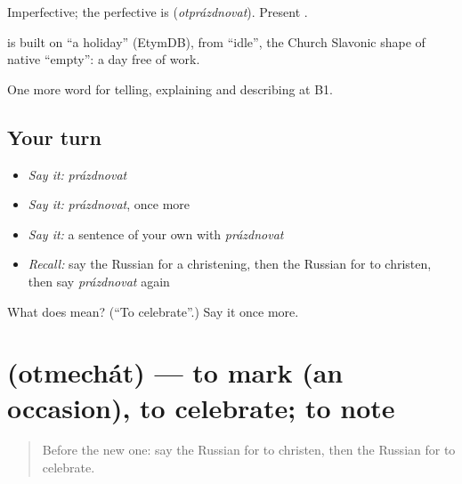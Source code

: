 Imperfective; the perfective is \emph{} (\emph{otprázdnovat}). Present \emph{}.

\begin{cousinweb}
\emph{} is built on \emph{} \textquotedblleft{}a holiday\textquotedblright{} (EtymDB), from \emph{} \textquotedblleft{}idle\textquotedblright{}, the Church Slavonic shape of native \emph{} \textquotedblleft{}empty\textquotedblright{}: a day free of work.
\end{cousinweb}

\begin{grammarlens}[title={What you've built}]
One more word for telling, explaining and describing at B1.
\end{grammarlens}

\subsection*{Your turn}
\begin{itemize}
\raggedright
  \item \emph{Say it:} \emph{prázdnovat}
  \item \emph{Say it:} \emph{prázdnovat}, once more
  \item \emph{Say it:} a sentence of your own with \emph{prázdnovat}
  \item \emph{Recall:} say the Russian for a christening, then the Russian for to christen, then say \emph{prázdnovat} again
\end{itemize}

\begin{tcolorbox}[breakable,colback=teal!4,colframe=teal!35!black,title={Before you move on}]
What does  mean? (\textquotedblleft{}To celebrate\textquotedblright{}.) Say it once more.
\end{tcolorbox}
\section[\texorpdfstring{\ru{отмечать} (otmechát)}{отмечать (otmechát)}]{ (otmechát) — to mark (an occasion), to celebrate; to note}

\label{lesson:RU-C311-otmechat}



\begin{quote}
Before the new one: say the Russian for to christen, then the Russian for to celebrate.
\end{quote}

